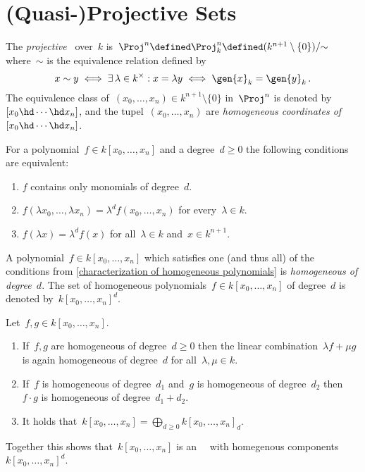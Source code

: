 \section{(Quasi-)Projective Sets}


\begin{definition}
  The \emph{projective~} over~$k$ is~$\Proj^n \defined \Proj^n_k \defined ( k^{n+1} \setminus \{0\} )/{\sim}$ where~$\sim$ is the equivalence relation defined by
  \[
          x \sim y
    \iff  \exists\, \lambda \in k^\times : x = \lambda y
    \iff  \gen{x}_k = \gen{y}_k \,.
  \]
  The equivalence class of~$(x_0, \dotsc, x_n) \in k^{n+1} \setminus \{0\}$ in~$\Proj^n$ is denoted by~$[x_0 \hd \dotsb \hd x_n]$, and the tupel~$(x_0, \dotsc, x_n)$ are \emph{homogeneous coordinates of~$[x_0 \hd \dotsb \hd x_n]$}.
\end{definition}


\begin{lemma}
  \label{characterization of homogeneous polynomials}
  For a polynomial~$f \in k[x_0, \dotsc, x_n]$ and a degree~$d \geq 0$ the following conditions are equivalent:
  \begin{enumerate}
    \item
      $f$ contains only monomials of degree~$d$.
    \item
      $f(\lambda x_0, \dotsc, \lambda x_n) = \lambda^d f(x_0, \dotsc, x_n)$ for every~$\lambda \in k$.
    \item
      $f(\lambda x) = \lambda^d f(x)$ for all~$\lambda \in k$ and~$x \in k^{n+1}$.
  \end{enumerate}
\end{lemma}


\begin{definition}
  A polynomial~$f \in k[x_0, \dotsc, x_n]$ which satisfies one (and thus all) of the conditions from \cref{characterization of homogeneous polynomials} is \emph{homogeneous of degree~$d$}.
  The set of homogeneous polynomials~$f \in k[x_0, \dotsc, x_n]$ of degree~$d$ is denoted by~$k[x_0, \dotsc, x_n]^d$.
\end{definition}


\begin{lemma}
  Let~$f, g\in k[x_0, \dotsc, x_n]$.
  \begin{enumerate}
    \item
      If~$f,g$ are homogeneous of degree~$d \geq 0$ then the linear combination~$\lambda f + \mu g$ is again homogeneous of degree~$d$ for all~$\lambda, \mu \in k$.
    \item
      If~$f$ is homogeneous of degree~$d_1$ and~$g$ is homogeneous of degree~$d_2$ then~$f \cdot g$ is homogeneous of degree~$d_1 + d_2$.
    \item
      It holds that~$k[x_0, \dotsc, x_n] = \bigoplus_{d \geq 0} k[x_0, \dotsc, x_n]_d$.
  \end{enumerate}
  Together this shows that~$k[x_0, \dotsc, x_n]$ is an~~ with homegenous components~$k[x_0, \dotsc, x_n]^d$.
\end{lemma}


